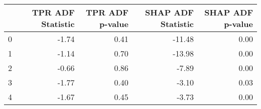 \begin{tabular}{lrrrr}
\toprule
 & TPR ADF Statistic & TPR ADF p-value & SHAP ADF Statistic & SHAP ADF p-value \\
\midrule
0 & -1.74 & 0.41 & -11.48 & 0.00 \\
1 & -1.14 & 0.70 & -13.98 & 0.00 \\
2 & -0.66 & 0.86 & -7.89 & 0.00 \\
3 & -1.77 & 0.40 & -3.10 & 0.03 \\
4 & -1.67 & 0.45 & -3.73 & 0.00 \\
\bottomrule
\end{tabular}
